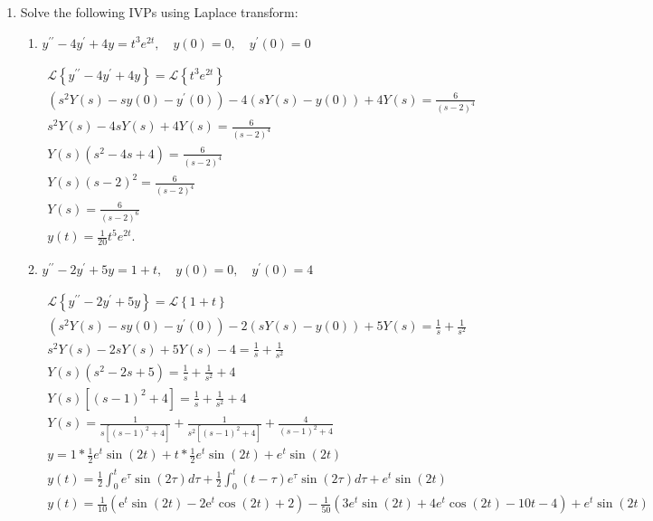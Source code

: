 \documentclass{zc-ust-hw}
\renewcommand{\L}[1]{\mathscr{L}\left\{#1\right\}}
\begin{document}
\begin{enumerate}
  \item Solve the following IVPs using Laplace transform:
    \begin{enumerate}
        \item $y^{\prime \prime}-4 y^{\prime}+4 y=t^3 e^{2 t}, \quad y(0)=0, \quad y^{\prime}(0)=0$
          \begin{sol}
            \begin{gather}
              \L{y^{\prime\prime}-4 y^{\prime}+4 y} = \L{t^3 e^{2t}} \\
              \left( s^2 Y(s)-sy(0)-y^{\prime}(0) \right)-4\left( sY(s)-y(0) \right)+4Y(s) = \frac{6}{(s-2)^4} \\
              s^2 Y(s) -4 sY(s) +4Y(s) = \frac{6}{(s-2)^4} \\
              Y(s)(s^2-4s+4) = \frac{6}{(s-2)^4} \\
              Y(s)(s-2)^2 = \frac{6}{(s-2)^4} \\
              Y(s)= \frac{6}{(s-2)^6} \\
              y(t)= \frac{1}{20}t^5e^{2t}
            .\end{gather}
          \end{sol}
          \newpage
        \item $y^{\prime \prime}-2 y^{\prime}+5 y=1+t, \quad y(0)=0, \quad y^{\prime}(0)=4$
          \begin{sol}
            \begin{gather}
              \L{y^{\prime\prime}-2 y^{\prime}+5 y} = \L{1+t} \\
              \left( s^2 Y(s)-sy(0)-y^{\prime}(0) \right)-2\left( sY(s)-y(0) \right)+5Y(s) = \frac{1}{s}+\frac{1}{s^2} \\
              s^2 Y(s) -2 sY(s) +5Y(s) -4 = \frac{1}{s}+\frac{1}{s^2} \\
              Y(s)(s^2-2s+5) = \frac{1}{s}+\frac{1}{s^2}+4 \\
              Y(s)[(s-1)^2+4] = \frac{1}{s}+\frac{1}{s^2}+4 \\
              Y(s) = \frac{1}{s[(s-1)^2+4]}+\frac{1}{s^2[(s-1)^2+4]}+\frac{4}{(s-1)^2+4} \\
              y = 1 \ast \frac{1}{2}e^{t}\sin(2t) + t \ast \frac{1}{2}e^{t}\sin(2t) + e^{t}\sin(2t) \\
              y(t) = \frac{1}{2}\int_{0}^{t} e^{\tau }\sin(2\tau ) d\tau  + \frac{1}{2}\int_{0}^{t}  (t-\tau)e^{\tau }\sin (2\tau )d\tau  + e^{t}\sin(2t) \\
              y(t) = \frac{1}{10} \left( {\mathrm{e}^t\sin\left(2t\right)-2\mathrm{e}^t\cos\left(2t\right)}+2 \right) - \frac{1}{50} \left( 3e^{t}\sin (2t) +4e^{t}\cos (2t)-10t-4   \right) + e^{t}\sin(2t) \\ 

\end{gather}
\end{sol}
\end{enumerate}
\end{enumerate}
\end{document}
